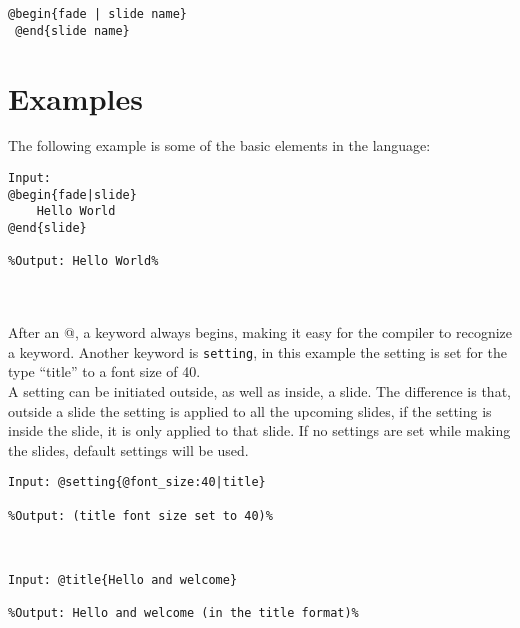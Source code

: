 \begin{lstlisting}[frame=single]
 @begin{fade | slide name}
 @end{slide name}
\end{lstlisting}


\section{Examples}
The following example is some of the basic elements in the language:
\begin{lstlisting}[frame=single]
Input:
@begin{fade|slide}
    Hello World
@end{slide}

%Output: Hello World%
\end{lstlisting}

\\ \\
After an @, a keyword always begins, making it easy for the compiler to recognize a keyword.
Another keyword is \texttt{setting}, in this example the setting is set for the type ``title'' to a font size of 40. \\
A setting can be initiated outside, as well as inside, a slide. The difference is that, outside a slide the setting is applied to all the upcoming slides, if the setting is inside the slide, it is only applied to that slide. If no settings are set while making the slides, default settings will be used.

\begin{lstlisting}[frame=single]
Input: @setting{@font_size:40|title}

%Output: (title font size set to 40)%
\end{lstlisting}

 \\

\begin{lstlisting}[frame=single]
Input: @title{Hello and welcome}

%Output: Hello and welcome (in the title format)%
\end{lstlisting}



